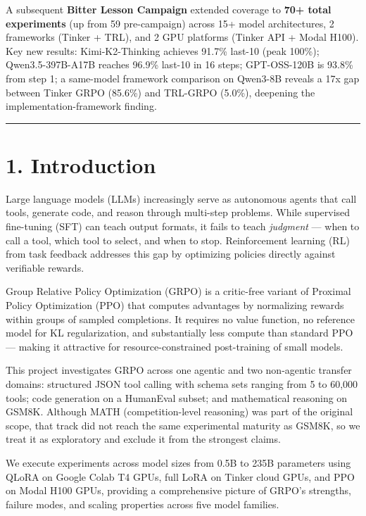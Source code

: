\documentclass[
  american,
  11pt,
  a4paper,
  oneside]{report}
\begin{document}
A subsequent \textbf{Bitter Lesson Campaign} extended coverage to
\textbf{70+ total experiments} (up from 59 pre-campaign) across 15+
model architectures, 2 frameworks (Tinker + TRL), and 2 GPU platforms
(Tinker API + Modal H100). Key new results: Kimi-K2-Thinking achieves
91.7\% last-10 (peak 100\%); Qwen3.5-397B-A17B reaches 96.9\% last-10 in
16 steps; GPT-OSS-120B is 93.8\% from step 1; a same-model framework
comparison on Qwen3-8B reveals a 17x gap between Tinker GRPO (85.6\%)
and TRL-GRPO (5.0\%), deepening the implementation-framework finding.

\begin{center}\rule{0.5\linewidth}{0.5pt}\end{center}

\chapter{1. Introduction}\label{introduction}

Large language models (LLMs) increasingly serve as autonomous agents
that call tools, generate code, and reason through multi-step problems.
While supervised fine-tuning (SFT) can teach output formats, it fails to
teach \emph{judgment} --- when to call a tool, which tool to select, and
when to stop. Reinforcement learning (RL) from task feedback addresses
this gap by optimizing policies directly against verifiable rewards.

Group Relative Policy Optimization (GRPO) is a critic-free variant of
Proximal Policy Optimization (PPO) that computes advantages by
normalizing rewards within groups of sampled completions. It requires no
value function, no reference model for KL regularization, and
substantially less compute than standard PPO --- making it attractive
for resource-constrained post-training of small models.

This project investigates GRPO across one agentic and two non-agentic
transfer domains: structured JSON tool calling with schema sets ranging
from 5 to 60,000 tools; code generation on a HumanEval subset; and
mathematical reasoning on GSM8K. Although MATH (competition-level
reasoning) was part of the original scope, that track did not reach the
same experimental maturity as GSM8K, so we treat it as exploratory and
exclude it from the strongest claims.

We execute experiments across model sizes from 0.5B to 235B parameters
using QLoRA on Google Colab T4 GPUs, full LoRA on Tinker cloud GPUs, and
PPO on Modal H100 GPUs, providing a comprehensive picture of GRPO's
strengths, failure modes, and scaling properties across five model
families.
\end{document}
